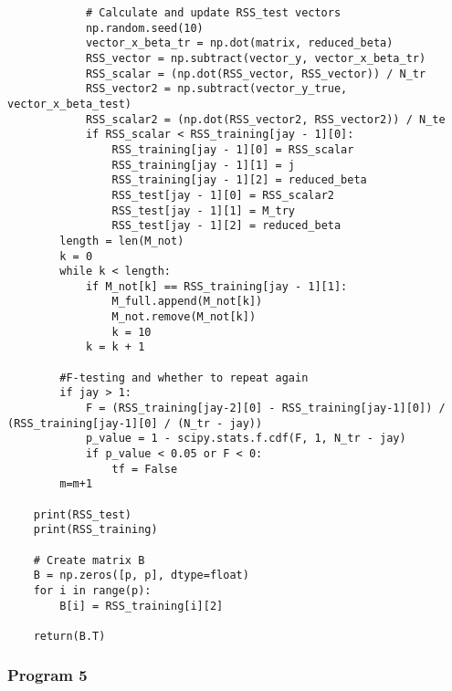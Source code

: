 \documentclass{article}
\begin{document}
\begin{lstlisting}
            # Calculate and update RSS_test vectors
            np.random.seed(10)
            vector_x_beta_tr = np.dot(matrix, reduced_beta)
            RSS_vector = np.subtract(vector_y, vector_x_beta_tr)
            RSS_scalar = (np.dot(RSS_vector, RSS_vector)) / N_tr
            RSS_vector2 = np.subtract(vector_y_true, vector_x_beta_test)
            RSS_scalar2 = (np.dot(RSS_vector2, RSS_vector2)) / N_te
            if RSS_scalar < RSS_training[jay - 1][0]:
                RSS_training[jay - 1][0] = RSS_scalar
                RSS_training[jay - 1][1] = j
                RSS_training[jay - 1][2] = reduced_beta
                RSS_test[jay - 1][0] = RSS_scalar2
                RSS_test[jay - 1][1] = M_try
                RSS_test[jay - 1][2] = reduced_beta
        length = len(M_not)
        k = 0
        while k < length:
            if M_not[k] == RSS_training[jay - 1][1]:
                M_full.append(M_not[k])
                M_not.remove(M_not[k])
                k = 10
            k = k + 1

        #F-testing and whether to repeat again
        if jay > 1:
            F = (RSS_training[jay-2][0] - RSS_training[jay-1][0]) / (RSS_training[jay-1][0] / (N_tr - jay))
            p_value = 1 - scipy.stats.f.cdf(F, 1, N_tr - jay)
            if p_value < 0.05 or F < 0:
                tf = False
        m=m+1

    print(RSS_test)
    print(RSS_training)

    # Create matrix B
    B = np.zeros([p, p], dtype=float)
    for i in range(p):
        B[i] = RSS_training[i][2]

    return(B.T)
\end{lstlisting}

\vspace{-0.5cm}
\subsubsection{Program 5}
\vspace{-0.5cm}
\label{subsec:Program 5} 
\end{document}
